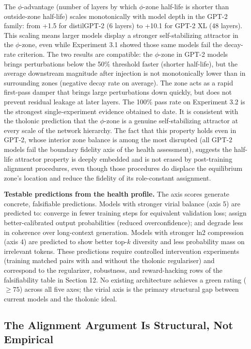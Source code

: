 \documentclass[12pt]{article}
\begin{document}
The \(\phi\)-advantage (number of layers by which \(\phi\)-zone
half-life is shorter than outside-zone half-life) scales monotonically
with model depth in the GPT-2 family: from +1.5 for distilGPT-2 (6
layers) to +10.1 for GPT-2 XL (48 layers). This scaling means larger
models display a stronger self-stabilizing attractor in the
\(\phi\)-zone, even while Experiment 3.1 showed those same models fail
the decay-rate criterion. The two results are compatible: the
\(\phi\)-zone in GPT-2 models brings perturbations below the 50\%
threshold faster (shorter half-life), but the average downstream
magnitude after injection is not monotonically lower than in surrounding
zones (negative decay rate on average). The zone acts as a rapid
first-pass damper that brings large perturbations down quickly, but does
not prevent residual leakage at later layers. The 100\% pass rate on
Experiment 3.2 is the strongest single-experiment evidence obtained to
date. It is consistent with the tholonic prediction that the
\(\phi\)-zone is a genuine self-stabilizing attractor at every scale of
the network hierarchy. The fact that this property holds even in GPT-2,
whose interior zone balance is among the most disrupted (all GPT-2
models fail the boundary fidelity axis of the health assessment),
suggests the half-life attractor property is deeply embedded and is not
erased by post-training alignment procedures, even though those
procedures do displace the equilibrium zone's location and reduce the
fidelity of its role-constant assignment.

\textbf{Testable predictions from the health profile.} The axis scores
generate concrete, falsifiable predictions. Models with stronger virial
balance (axis 5) are predicted to: converge in fewer training steps for
equivalent validation loss; assign better-calibrated output
probabilities (reduced overconfidence); and degrade less in coherence
over long-context generation. Models with stronger ln2 compression (axis
4) are predicted to show better top-\(k\) diversity and less probability
mass on irrelevant tokens. These predictions require controlled
intervention experiments (training matched pairs with and without the
tholonic regulariser) and correspond to the regularizer, robustness, and
reward-hacking rows of the falsifiability table in Section 12. No
existing architecture achieves a green rating (\(\geq 75\)) across all
five axes; the virial axis is the primary structural gap between current
models and the tholonic ideal.

\subsection{The Alignment Argument Is Structural, Not Empirical}\label{the-alignment-argument-is-structural-not-empirical}
\end{document}
